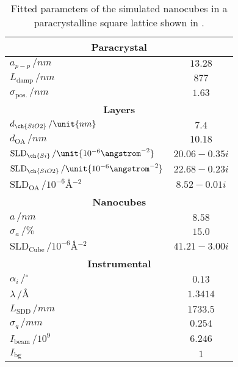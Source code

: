 \documentclass[\main/dresen_thesis.tex]{subfiles}
\begin{document}
  \begin{table}[!htbp]
    \centering
    \caption{\label{tab:monolayers:structure:squareArrayParacrystal:BornAgainSimulation}Fitted parameters of the simulated nanocubes in a paracrystalline square lattice shown in . }
    \begin{tabular}{l | c}
      \hline
      \multicolumn{2}{c}{\textbf{Paracrystal}}\\
      \hline
      $a_{p-p} \, / \unit{nm}$             & $13.28$ \\
      $L_\mathrm{damp} \, / \unit{nm}$     & $877$ \\
      $\sigma_\mathrm{pos.}\, / \unit{nm}$ & $1.63$ \\
      \hline
      \multicolumn{2}{c}{\textbf{Layers}}\\
      \hline
      $d_{\ch{SiO2}}\, / \unit{nm}$                                 &   $7.4$\\
      $d_{\mathrm{OA}}\, / \unit{nm}$                               &   $10.18$\\
      $\mathrm{SLD}_{\ch{Si}} \, / \unit{10^{-6} \angstrom^{-2}}$   &   $20.06 - 0.35 i$\\
      $\mathrm{SLD}_{\ch{SiO2}} \, / \unit{10^{-6} \angstrom^{-2}}$ &   $22.68 - 0.23 i$\\
      $\mathrm{SLD}_\mathrm{OA} \, / \unit{10^{-6} \angstrom^{-2}}$ &   $8.52 - 0.01 i$ \\
      \hline
      \multicolumn{2}{c}{\textbf{Nanocubes}}\\
      \hline
      $a \, / \unit{nm}$                                              & $8.58$ \\
      $\sigma_a \, / \unit{\%}$                                              & $15.0$ \\
      $\mathrm{SLD}_\mathrm{Cube} \, / \unit{10^{-6} \angstrom^{-2}}$ & $41.21 - 3.00 i$ \\
      \hline
      \multicolumn{2}{c}{\textbf{Instrumental}}\\
      \hline
      $\alpha_i \, / \unit{^\circ}$      & $0.13$ \\
      $\lambda \, / \unit{\angstrom}$    & $1.3414$ \\
      $L_\mathrm{SDD} \, / \unit{mm}$    & $1733.5$ \\
      $\sigma_q \, /\unit{mm}$           & $0.254$ \\
      $I_\mathrm{beam} \, / \unit{10^9}$ & $6.246$ \\
      $I_\mathrm{bg}$                    & $1$ \\
      \hline
    \end{tabular}
  \end{table}
\end{document}
